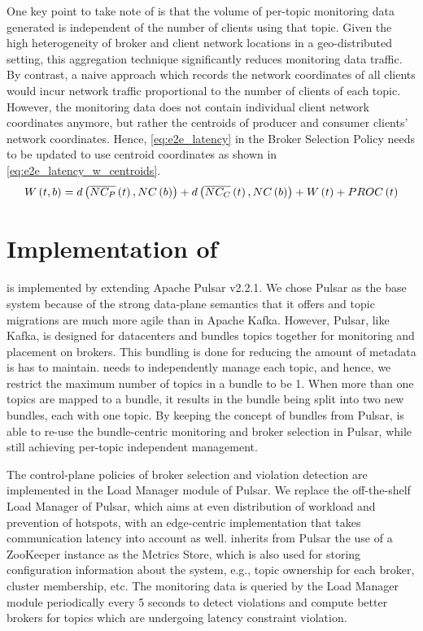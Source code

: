 \par One key point to take note of is that the volume of per-topic monitoring data generated is independent of the number of clients using that topic. Given the high heterogeneity of broker and client network locations in a geo-distributed setting, this aggregation technique significantly reduces monitoring data traffic. By contrast, a naive approach which records the network coordinates of all clients would incur network traffic proportional to the number of clients of each topic. However, the monitoring data does not contain individual client network coordinates anymore, but rather the centroids of producer and consumer clients' network coordinates. Hence, \cref{eq:e2e_latency} in the Broker Selection Policy needs to be updated to use centroid coordinates as shown in \cref{eq:e2e_latency_w_centroids}.
\begin{equation}
\label{eq:e2e_latency_w_centroids}
W \left( t, b\right) = d \left( \overline{NC_P} \left( t \right), NC \left( b \right) \right) + d \left( \overline{NC_C} \left( t \right), NC \left( b \right) \right) + W \left( t \right) + PROC \left( t \right)
\vspace{-0.05in}
\end{equation}

\section{Implementation of \epulsar{}}
\label{sec:epulsar_impl}
\epulsar{} is implemented by extending Apache Pulsar v2.2.1. We chose Pulsar as the base system because of the strong data-plane semantics that it offers and topic migrations are much more agile than in Apache Kafka. However, Pulsar, like Kafka, is designed for datacenters and bundles topics together for monitoring and placement on brokers. This bundling is done for reducing the amount of metadata is has to maintain. \epulsar{} needs to independently manage each topic, and hence, we restrict the maximum number of topics in a bundle to be 1. When more than one topics are mapped to a bundle, it results in the bundle being split into two new bundles, each with one topic. By keeping the concept of bundles from Pulsar, \epulsar{} is able to re-use the bundle-centric monitoring and broker selection in Pulsar, while still achieving per-topic independent management.
\par The control-plane policies of broker selection and violation detection are implemented in the Load Manager module of Pulsar. We replace the off-the-shelf Load Manager of Pulsar, which aims at even distribution of workload and prevention of hotspots, with an edge-centric implementation that takes communication latency into account as well. \epulsar{} inherits from Pulsar the use of a ZooKeeper instance as the Metrics Store, which is also used for storing configuration information about the system, e.g., topic ownership for each broker, cluster membership, etc. The monitoring data is queried by the Load Manager module periodically every 5 seconds to detect violations and compute better brokers for topics which are undergoing latency constraint violation.


